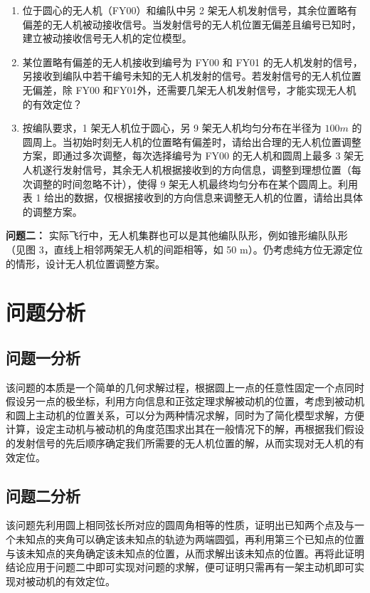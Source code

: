 \documentclass[withoutpreface,bwprint]{cumcmthesis} %
\begin{document}
\begin{enumerate}
    \item 位于圆心的无人机（FY00）和编队中另 2 架无人机发射信号，其余位置略有偏差的无人机被动接收信号。当发射信号的无人机位置无偏差且编号已知时，建立被动接收信号无人机的定位模型。
    \item 某位置略有偏差的无人机接收到编号为 FY00 和 FY01 的无人机发射的信号，另接收到编队中若干编号未知的无人机发射的信号。若发射信号的无人机位置无偏差，除 FY00 和FY01外，还需要几架无人机发射信号，才能实现无人机的有效定位？
    \item 按编队要求，1 架无人机位于圆心，另 9 架无人机均匀分布在半径为 $100m$ 的圆周上。当初始时刻无人机的位置略有偏差时，请给出合理的无人机位置调整方案，即通过多次调整，每次选择编号为 FY00 的无人机和圆周上最多 3 架无人机遂行发射信号，其余无人机根据接收到的方向信息，调整到理想位置（每次调整的时间忽略不计），使得 9 架无人机最终均匀分布在某个圆周上。利用表 1 给出的数据，仅根据接收到的方向信息来调整无人机的位置，请给出具体的调整方案。
\end{enumerate}

\textbf{问题二：}
实际飞行中，无人机集群也可以是其他编队队形，例如锥形编队队形（见图 3，直线上相邻两架无人机的间距相等，如 50 m）。仍考虑纯方位无源定位的情形，设计无人机位置调整方案。

\section{问题分析}

\subsection{问题一分析}
该问题的本质是一个简单的几何求解过程，根据圆上一点的任意性固定一个点同时假设另一点的极坐标，利用方向信息和正弦定理求解被动机的位置，考虑到被动机和圆上主动机的位置关系，可以分为两种情况求解，同时为了简化模型求解，方便计算，设定主动机与被动机的角度范围求出其在一般情况下的解，再根据我们假设的发射信号的先后顺序确定我们所需要的无人机位置的解，从而实现对无人机的有效定位。

\subsection{问题二分析}
该问题先利用圆上相同弦长所对应的圆周角相等的性质，证明出已知两个点及与一个未知点的夹角可以确定该未知点的轨迹为两端圆弧，再利用第三个已知点的位置与该未知点的夹角确定该未知点的位置，从而求解出该未知点的位置。再将此证明结论应用于问题二中即可实现对问题的求解，便可证明只需再有一架主动机即可实现对被动机的有效定位。
\end{document}
